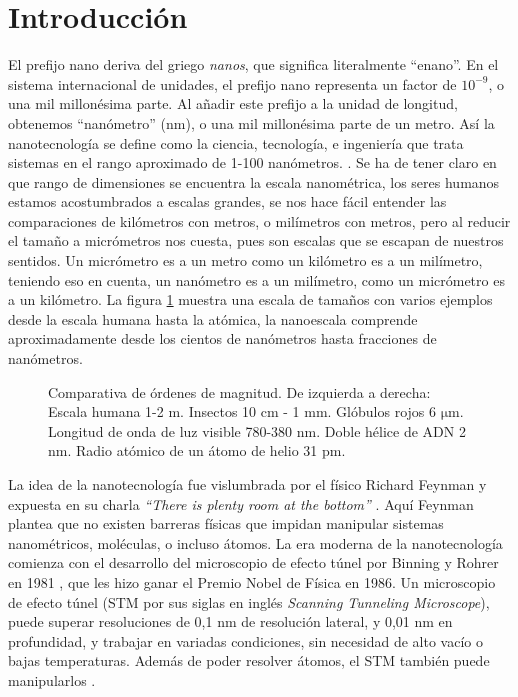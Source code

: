 \chapter*{Introducción}

El prefijo nano deriva del griego \emph{nanos}, que significa literalmente ``enano''. En el sistema internacional de unidades, el prefijo nano representa un factor de $\mathrm{10^{-9}}$, o una mil millonésima parte. Al añadir este prefijo a la unidad de longitud, obtenemos ``nanómetro'' (nm), o una mil millonésima parte de un metro. Así la nanotecnología se define como la ciencia, tecnología, e ingeniería que trata sistemas en el rango aproximado de 1-100 nanómetros. \citep{Haick2013,Gressler2013}. Se ha de tener claro en que rango de dimensiones se encuentra la escala nanométrica, los seres humanos estamos acostumbrados a escalas grandes, se nos hace fácil entender las comparaciones de kilómetros con metros, o milímetros con metros, pero al reducir el tamaño a micrómetros nos cuesta, pues son escalas que se escapan de nuestros sentidos. Un micrómetro es a un metro como un kilómetro es a un milímetro, teniendo eso en cuenta, un nanómetro es a un milímetro, como un micrómetro es a un kilómetro. La figura \ref{fig:scale} muestra una escala de tamaños con varios ejemplos desde la escala humana hasta la atómica, la nanoescala comprende aproximadamente desde los cientos de nanómetros hasta fracciones de nanómetros.

\begin{figure}[h!]
	\centering
	\caption[Comparativa de ódenes de magnitud desde metros hasta picometros]{Comparativa de órdenes de magnitud. De izquierda a derecha: Escala humana 1-2 m. Insectos 10 cm - 1 mm. Glóbulos rojos 6 $\mathrm{\mu}$m. Longitud de onda de luz visible 780-380 nm. Doble hélice de ADN 2 nm. Radio atómico de un átomo de helio 31 pm.}
\label{fig:scale}
\end{figure}

La idea de la nanotecnología fue vislumbrada por el físico Richard Feynman y expuesta en su charla \emph{``There is plenty room at the bottom''} \citep{Feynman1960}. Aquí Feynman plantea que no existen barreras físicas que impidan manipular sistemas nanométricos, moléculas, o incluso átomos. La era moderna de la nanotecnología comienza con el desarrollo del microscopio de efecto túnel por Binning y Rohrer en 1981 \citep{Binnig1982}, que les hizo ganar el Premio Nobel de Física en 1986. Un microscopio de efecto túnel (STM por sus siglas en inglés \emph{Scanning Tunneling Microscope}), puede superar resoluciones de 0,1 nm de resolución lateral, y 0,01 nm en profundidad, y trabajar en variadas condiciones, sin necesidad de alto vacío o bajas temperaturas. Además de poder resolver átomos, el STM también puede manipularlos \citep{Chen2008}.

